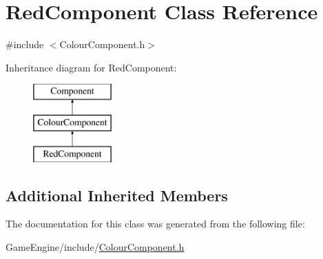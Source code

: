 \hypertarget{class_red_component}{}\section{Red\+Component Class Reference}
\label{class_red_component}


{\ttfamily \#include $<$Colour\+Component.\+h$>$}

Inheritance diagram for Red\+Component\+:\begin{figure}[H]
\begin{center}
\leavevmode
\includegraphics[height=3.000000cm]{class_red_component}
\end{center}
\end{figure}
\subsection*{Additional Inherited Members}


The documentation for this class was generated from the following file\+:\begin{DoxyCompactItemize}
\item 
Game\+Engine/include/\mbox{\hyperlink{_colour_component_8h}{Colour\+Component.\+h}}\end{DoxyCompactItemize}
